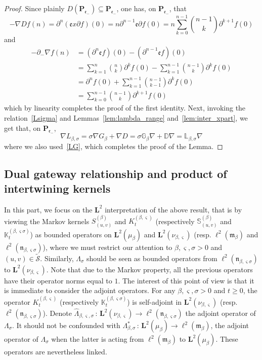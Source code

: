 \documentclass[10pt]{amsart}
\theoremstyle{definition}\newtheorem{defi}[theo]{Definition}\newtheorem{rema}[theo]{Remark}\newtheorem{exam}[theo]{Example}\newtheorem{exem}[theo]{Example}\newtheorem{nota}[theo]{Notation}
\newcommand{\cS}{{\mathcal S}}
\newcommand{\fe}{\mathfrak{e}}
\newcommand{\fm}{\mathfrak{m}}
\newcommand{\fn}{\mathfrak{n}}
\newcommand{\na}{\nabla}
\newcommand{\ri}{\rightarrow}
\newcommand{\wi}{\widetilde}
\newcommand{\wit}{\widehat}
\newcommand{\st}{\,:\,}
\newcommand{\dLs}{{\discret{K}}}
\newcommand{\esP}{\mathbf{P}}
\newcommand{\esL}{\mathbf{L}}
\newcommand{\esLd}{\ell}
\newcommand{\discret}[1]{\mathds{#1}}
\newcommand{\cont}[1]{{#1}}
\begin{document}
\begin{proof}
Since plainly $ D(\esP_{\fe_{-}})\subseteq \esP_{\fe_{-}}$, one has, on $\esP_{\fe_{-}}$, that
\[
-\na D f(n) = \partial^n(\fe x\partial f)(0) = n\partial^{n-1}\fe \partial f(0) =n \sum_{k=0}^{n-1} \binom{n-1}{k}\partial^{k+1}f(0)
\]
and
\begin{align*}
-\partial_-\na f(n) &= (\partial^{n}\fe f)(0)-(\partial^{n-1}\fe f)(0)\\
&=
\sum_{k=1}^{n} \binom{n}{k}\partial^{k}f(0)-\sum_{k=1}^{n-1} \binom{n-1}{k}\partial^{k}f(0)\\
&= \partial^{n}f(0) + \sum_{k=1}^{n-1} \binom{n-1}{k-1}\partial^{k}f(0)\\
&= \sum_{k=0}^{n-1} \binom{n-1}{k}\partial^{k+1}f(0)
\end{align*}
which by linearity completes the proof of the first identity. Next, invoking the relation~\eqref{Lsigma} and Lemmas~\ref{lem:lambda_range} and~\ref{lem:inter_xpart}, we get that, on $\esP_{\fe_{-}}$,
\begin{equation*}
\na \cont{L}_{\beta,\sigma} = \sigma \na \cont{G}_{\beta}+ \na D = \sigma \discret{G}_{\beta} \na + \discret{D}\na = \discret{L}_{\beta,\sigma} \na
\end{equation*}
where we also used~\eqref{LG}, which completes the proof of the Lemma.
\end{proof}

\subsection{Dual gateway relationship and product of intertwining kernels}

In this part, we focus on the $\esL^2$ interpretation of the above result, that is by viewing the Markov kernels $S_{(u,v)}^{(\beta)}$ and $K_t^{(\beta,\varsigma)}$ (respectively $\discret{S}_{(u,v)}^{(\beta)}$ and $\dLs_t^{(\beta,\varsigma\sigma)}$) as bounded operators on $\esL^2(\mu_\beta)$ and $\esL^2(\nu_{\beta,\varsigma})$ (resp. $\esLd^2(\fm_{\beta})$ and $\esLd^2(\fn_{\beta,\varsigma\sigma})$), where we must restrict our attention to $\beta,\varsigma,\sigma >0$ and $(u,v)\in\wi \cS$. Similarly, $\Lambda_\sigma$ should be seen as bounded operators from $\esLd^2(\fn_{\beta,\varsigma\sigma})$ to $\esL^2(\nu_{\beta,\varsigma})$. Note that due to the Markov property, all the previous operators have their operator norms equal to $1$. The interest of this point of view is that it is immediate to consider the adjoint operators. For any $\beta,\varsigma,\sigma>0$ and $ t\geq 0$, the operator $K_t^{(\beta,\varsigma)}$ (respectively $\dLs_t^{(\beta,\varsigma\sigma)}$) is self-adjoint in $\esL^2(\nu_{\beta,\varsigma})$ (resp. $\esLd^2(\fn_{\beta,\varsigma\sigma})$). Denote $\wit \Lambda_{\beta,\varsigma,\sigma}\st \esL^2(\nu_{\beta,\varsigma})\ri \esLd^2(\fn_{\beta,\varsigma\sigma})$ the adjoint operator of $\Lambda_\sigma$. It should not be confounded with $\Lambda_{\beta,\sigma}^{*}\st \esL^2(\mu_{\beta})\ri \esLd^2(\fm_{\beta})$, the adjoint operator of $\Lambda_\sigma$ when the latter is acting from $\esLd^2(\fm_{\beta})$ to $\esL^2(\mu_{\beta})$. These operators are nevertheless linked.
\end{document}
